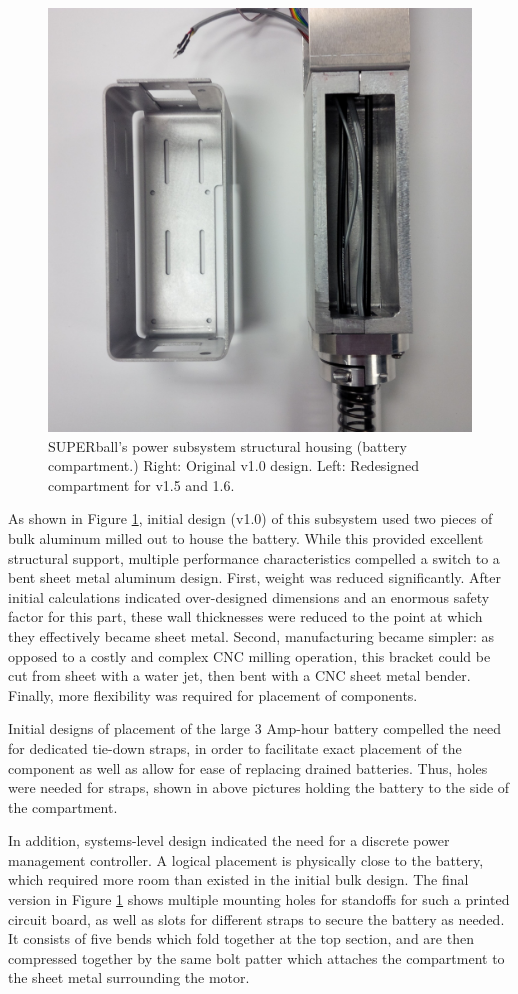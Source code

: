 \documentclass[12pt]{report}
\begin{document}
\begin{figure}
   \centering
   \includegraphics[width=0.45\columnwidth]{img/battery_compartment} 
   \caption{SUPERball's power subsystem structural housing (battery compartment.) Right: Original v1.0 design. Left: Redesigned compartment for v1.5 and 1.6.}
   \label{battery_compartment}
\end{figure}

As shown in Figure \ref{battery_compartment}, initial design (v1.0) of this subsystem used two pieces of bulk aluminum milled out to house the battery.
While this provided excellent structural support, multiple performance characteristics compelled a switch to a bent sheet metal aluminum design.
First, weight was reduced significantly. 
After initial calculations indicated over-designed dimensions and an enormous safety factor for this part, these wall thicknesses were reduced to the point at which they effectively became sheet metal.
Second, manufacturing became simpler: as opposed to a costly and complex CNC milling operation, this bracket could be cut from sheet with a water jet, then bent with a CNC sheet metal bender.
Finally, more flexibility was required for placement of components.

Initial designs of placement of the large 3 Amp-hour battery compelled the need for dedicated tie-down straps, in order to facilitate exact placement of the component as well as allow for ease of replacing drained batteries.
Thus, holes were needed for straps, shown in above pictures holding the battery to the side of the compartment.

In addition, systems-level design indicated the need for a discrete power management controller.
A logical placement is physically close to the battery, which required more room than existed in the initial bulk design.
The final version in Figure \ref{battery_compartment} shows multiple mounting holes for standoffs for such a printed circuit board, as well as slots for different straps to secure the battery as needed.
It consists of five bends which fold together at the top section, and are then compressed together by the same bolt patter which attaches the compartment to the sheet metal surrounding the motor.
\end{document}
